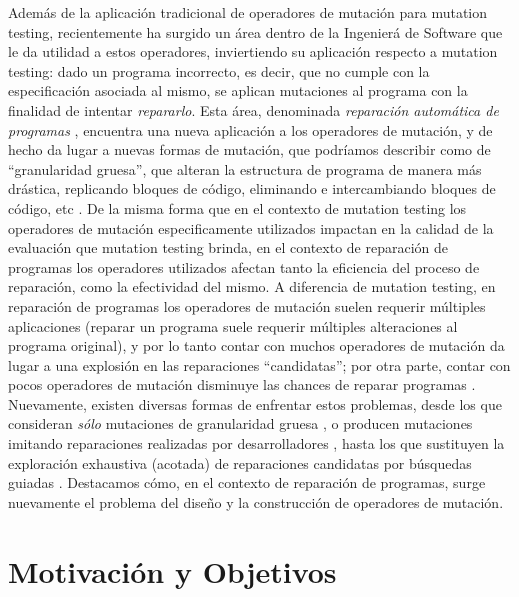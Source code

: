 Adem\'as de la aplicaci\'on tradicional de operadores de mutaci\'on para mutation testing, recientemente ha surgido un \'area dentro de la Ingenier\'a de Software que le da utilidad a estos operadores, inviertiendo su aplicaci\'on respecto a mutation testing: dado un programa incorrecto, es decir, que no cumple con la especificaci\'on asociada al mismo, se aplican mutaciones al programa con la finalidad de intentar \emph{repararlo}. Esta \'area, denominada \emph{reparaci\'on autom\'atica de programas} \cite{DBLP:journals/cacm/Harman10}, encuentra una nueva aplicaci\'on a los operadores de mutaci\'on, y de hecho da lugar a nuevas formas de mutaci\'on, que podr\'iamos describir como de ``granularidad gruesa'', que alteran la estructura de programa de manera m\'as dr\'astica, replicando bloques de c\'odigo, eliminando e intercambiando bloques de c\'odigo, etc \cite{bibliography.repair.GouesNFW12}. De la misma forma que en el contexto de mutation testing los operadores de mutaci\'on especificamente utilizados impactan en la calidad de la evaluaci\'on que mutation testing brinda, en el contexto de reparaci\'on de programas los operadores utilizados afectan tanto la eficiencia del proceso de reparaci\'on, como la efectividad del mismo. A diferencia de mutation testing, en reparaci\'on de programas los operadores de mutaci\'on suelen requerir m\'ultiples aplicaciones (reparar un programa suele requerir m\'ultiples alteraciones al programa original), y por lo tanto contar con muchos operadores de mutaci\'on da lugar a una explosi\'on en las reparaciones ``candidatas''; por otra parte, contar con pocos operadores de mutaci\'on disminuye las chances de reparar programas \cite{bibliography.repair.GouesNFW12}. Nuevamente, existen diversas formas de enfrentar estos problemas, desde los que consideran \emph{s\'olo} mutaciones de granularidad gruesa \cite{bibliography.repair.GouesNFW12}, o producen mutaciones imitando reparaciones realizadas por desarrolladores \cite{bibliography.repair.KimNSK13}, hasta los que sustituyen la exploraci\'on exhaustiva (acotada) de reparaciones candidatas por b\'usquedas guiadas \cite{bibliography.repair.GouesNFW12,bibliography.repair.StaberJB05,bibliography.repair.ArcuriY08}. Destacamos c\'omo, en el contexto de reparaci\'on de programas, surge nuevamente el problema del dise\~no y la construcci\'on de operadores de mutaci\'on.    


\section{Motivaci\'on y Objetivos}
\label{sec:intro.objetivos}


